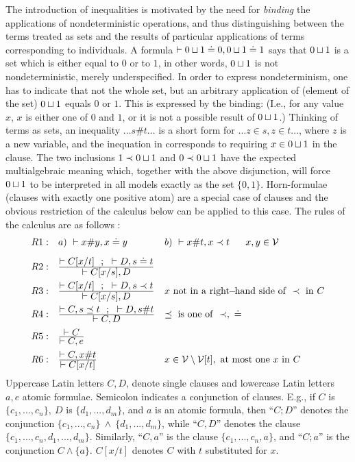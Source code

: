 {The introduction of inequalities is motivated by the need for {\em 
binding} the applications of 
nondeterministic operations, and thus distinguishing between the terms treated as 
sets and the results of 
particular applications of terms corresponding to individuals. A 
formula $\vdash 0\sqcup 1\doteq 0, 0\sqcup 1\doteq 1$ says that $0\sqcup 1$ is a 
set which is either equal to $0$ or to $1$, in other words, $0\sqcup 1$ is not 
nondeterministic, merely underspecified. 
In order to express nondeterminism, one has to indicate that not the 
whole set, but an arbitrary application of 
(element of the set) $0\sqcup 1$ equals $0$ or $1$. This is expressed by the binding: 
(I.e., for any value $x$, $x$ is either one of $0$ and $1$, or it is
not a possible result of $0\sqcup 1$.) Thinking of terms as sets, an
inequality $\ldots s\# t\ldots$ is a short form for $\ldots z\in s,
z\in t\ldots$, where $z$ is a new variable, and the inequation in
 corresponds to requiring $x\in 0\sqcup 1$ in the clause.
The two inclusions $1\mathrel{\prec} 0\sqcup 1$ and $0\mathrel{\prec} 0\sqcup 1$ have the
expected multialgebraic meaning which, together with the above
disjunction, will force $0\sqcup 1$ to be interpreted in all models
exactly as the set $\{0,1\}$. Horn-formulae (clauses with exactly one
positive atom) are a special case of clauses and the obvious
restriction of the calculus below can be applied to this case. The
rules of the calculus are as follows :
\[ \begin{array}{rll}
R1: & a)\ \pr x\# y, x\doteq y & b)\ \pr x\# t, x\Incl t\ \ \ \ \ x,y\in\Vars 
\\[2ex]
R2: & \prule{\pr C[x/t]\ \ ;\ \ \pr D,s\doteq t}{\pr C[x/s], D} 
\\[2ex]
R3: & \prule{\pr C[x/t]\ \ ;\ \ \pr D,s\Incl t}{\pr C[x/s], 
D} & x\ {\rm not\ in\ a\ right\!\!-\!\!hand\ side\ of\ }\Incl{\rm\ in\ }C 
\\[2ex]
R4: & \prule{\pr C, s\preceq t\ \ ;\ \ \pr D,s\# t}{\pr C, D} & 
\preceq {\rm\ is\ one\ of\ }\Incl,\ \doteq
\\[2ex]
R5: & \prule{\pr C}{\pr C,e}  \\[2ex]
R6: & \prule{\pr C,x\# t}{\pr C[x/t]} &
x\in\Vars\setminus\Vars[t],\ {\rm at\ most\ one\ }x{\rm\ in\ }C
\end{array}
\]
\noindent
Uppercase Latin letters $C, D$, denote single clauses and lowercase
Latin letters $a, e$ atomic formulae.  Semicolon indicates a
conjunction of clauses. E.g., if $C$ is $\{c_{1}, ..., c_{n}\},\ D$ is
$\{d_{1}, ..., d_{m}\}$, and $a$ is an atomic formula, then ``$C ;
D$'' denotes the conjunction $\{c_{1}, ..., c_{n}\}\ \land\ \{d_{1},
..., d_{m}\}$, while ``$C, D$'' denotes the clause $\{c_{1}, ...,
c_{n}, d_{1}, ..., d_{m}\}$.  Similarly, ``$C, a$'' is the clause
$\{c_{1}, ..., c_{n}, a\}$, and ``$C ; a$'' is the conjunction $C
\land \{a\}$.  $C[x/t]$ denotes $C$ with $t$ substituted for $x$.
 
}
